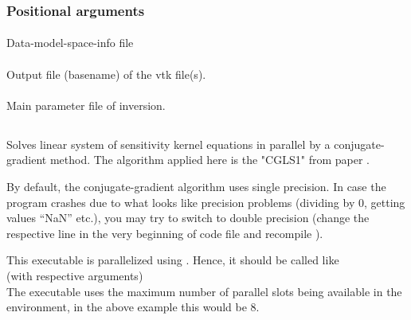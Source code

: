 \subsubsection{Positional arguments}
\paragraph{}
Data-model-space-info file   
\paragraph{}
Output file (basename) of the vtk file(s).
\paragraph{}
Main parameter file of inversion.  
%
%
\subsection{} \label{programs_scripts,sec:bin_prog,sec:solve_cgls_kernel_sys}
Solves linear system of sensitivity kernel equations in parallel by a conjugate-gradient method.
The algorithm applied here is the "CGLS1" from paper \cite{bjorck1998stability}.

By default, the conjugate-gradient algorithm uses single precision. In case the program crashes due to what
looks like precision problems (dividing by 0, getting values ``NaN'' etc.), you may try to switch to 
double precision (change the respective line in the very beginning of code file 
and recompile ).

This executable is parallelized using . Hence, it should be called like\\
 (with respective arguments)\\
The executable uses the maximum number of parallel slots being available in the  environment, in 
the above example this would be 8.

